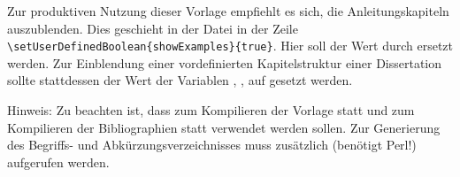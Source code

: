 Zur produktiven Nutzung dieser Vorlage empfiehlt es sich, 
die Anleitungskapiteln auszublenden.
Dies geschieht in der Datei
 in der Zeile
\lstinline|\setUserDefinedBoolean{showExamples}{true}|. Hier soll 
der Wert  durch  ersetzt werden.
Zur Einblendung einer vordefinierten Kapitelstruktur einer Dissertation
sollte stattdessen der Wert der Variablen
,
,
\usw
auf  gesetzt werden.



\begin{tcolorbox}[colback=orange]
\footnotesize
Hinweis:
Zu beachten ist, dass zum Kompilieren der Vorlage
 statt 
und zum Kompilieren der Bibliographien
 statt 
verwendet werden sollen.
Zur Generierung des Begriffs- und Abkürzungsverzeichnisses muss zusätzlich
 (benötigt Perl!) aufgerufen werden.
\end{tcolorbox}
